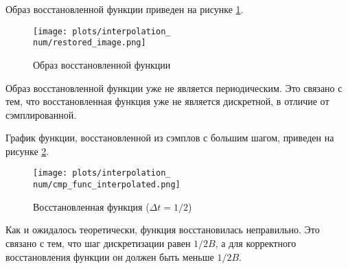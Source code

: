 Образ восстановленной функции приведен на рисунке \ref{fig:restored_image\num}.
\begin{figure}[ht!]
    \centering
    \texttt{[image: plots/interpolation\_\\num/restored\_image.png]}
    \caption{Образ восстановленной функции}
    \label{fig:restored_image\num}
\end{figure}

Образ восстановленной функции уже не является периодическим. Это связано с тем, что восстановленная 
функция уже не является дискретной, в отличие от сэмплированной. 

\def\num{5}
График функции, восстановленной из сэмплов с большим шагом, приведен на рисунке \ref{fig:interpolated_func\num}.
\begin{figure}[ht!]
    \centering
    \texttt{[image: plots/interpolation\_\\num/cmp\_func\_interpolated.png]}
    \caption{Восстановленная функция ($\Delta t = 1/2$)}
    \label{fig:interpolated_func\num}
\end{figure}

Как и ожидалось теоретически, функция восстановилась неправильно. Это связано с тем, что шаг дискретизации равен $1/2B$, а для корректного восстановления функции он должен быть меньше $1/2B$.